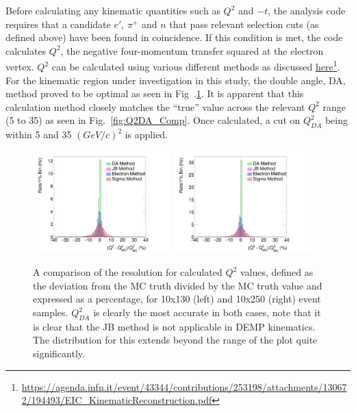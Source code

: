 \documentclass[letterpaper,12pt]{article}
\begin{document}
Before calculating any kinematic quantities such as $Q^{2}$ and $-t$, the analysis code requires that a candidate $e'$, $\pi^{+}$ and $n$ that pass relevant selection cuts (as defined above) have been found in coincidence. If this condition is met, the code calculates $Q^{2}$, the negative four-momentum transfer squared at the electron vertex. $Q^{2}$ can be calculated using various different methods as discussed \href{https://agenda.infn.it/event/43344/contributions/253198/attachments/130672/194493/EIC_KinematicReconstruction.pdf}{here}\footnote{\url{https://agenda.infn.it/event/43344/contributions/253198/attachments/130672/194493/EIC_KinematicReconstruction.pdf}}. For the kinematic region under investigation in this study, the double angle, DA, method proved to be optimal as seen in Fig~.\ref{fig:Q2_Comp}. It is apparent that this calculation method closely matches the ``true'' value across the relevant $Q^{2}$ range (5 to 35) as seen in Fig.~\ref{fig:Q2DA_Comp}. Once calculated, a cut on $Q^{2}_{DA}$ being within 5 and 35 $(GeV/c)^{2}$ is applied.

\begin{figure}[h]
    \centering
    \includegraphics[width=0.475\textwidth]{Figures/10on130_Q2Comp.png}
    \includegraphics[width=0.475\textwidth]{Figures/10on250_Q2Comp.png}
    \caption{A comparison of the resolution for calculated $Q^{2}$ values, defined as the deviation from the MC truth divided by the MC truth value and expressed as a percentage, for 10x130 (left) and 10x250 (right) event samples. $Q^{2}_{DA}$ is clearly the most accurate in both cases, note that it is clear that the JB method is not applicable in DEMP kinematics. The distribution for this extends beyond the range of the plot quite significantly.}
\label{fig:Q2_Comp}
\end{figure}
\end{document}

